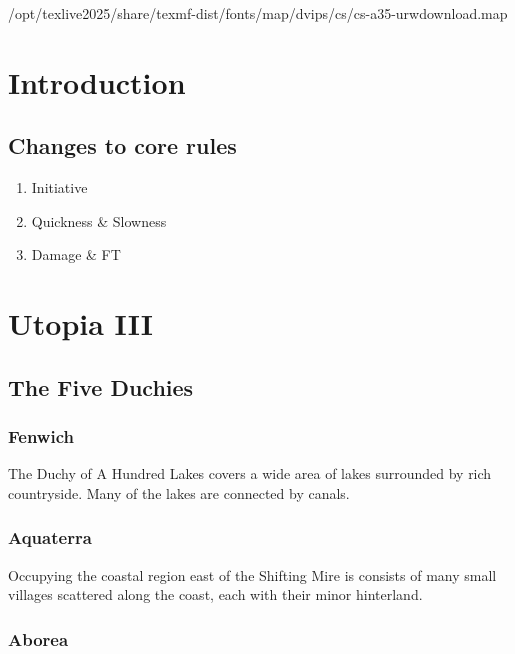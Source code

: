 /opt/texlive2025/share/texmf-dist/fonts/map/dvips/cs/cs-a35-urwdownload.map\documentclass{report}
\begin{document}
\chapter{Introduction}

\section{Changes to core rules}

\begin{enumerate}
\item Initiative
\item Quickness \& Slowness
\item Damage \& FT
\end{enumerate}

\chapter{Utopia III}

\section{The Five Duchies}

\subsection{Fenwich}

The Duchy of A Hundred Lakes covers a wide area of lakes surrounded by
rich countryside.  Many of the lakes are connected by canals.

\subsection{Aquaterra}

Occupying the coastal region east of the Shifting Mire is consists of
many small villages scattered along the coast, each with their minor
hinterland.

\subsection{Aborea}
\end{document}
